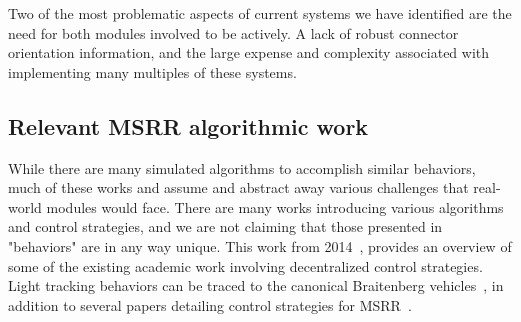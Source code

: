 Two of the most problematic aspects of current systems we have identified are the need for both modules involved to be actively. A lack of robust connector orientation information, and the large expense and complexity associated with implementing many multiples of these systems.


\subsection{Relevant MSRR algorithmic work}
\label{ssec:RW-Algorithmic}
While there are many simulated algorithms to accomplish similar behaviors, much of these works and assume and abstract away various challenges that real-world modules would face. There are many works introducing various algorithms and control strategies, and we are not claiming that those presented in "behaviors" are in any way unique. This work from 2014~\cite{abukhalil2013survey}, provides an overview of some of the existing academic work involving decentralized control strategies. Light tracking behaviors can be traced to the canonical Braitenberg vehicles~\cite{braitenberg1986vehicles}, in addition to several papers detailing control strategies for MSRR~\cite{claici2017distributed}.


